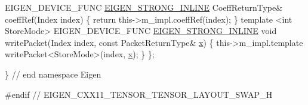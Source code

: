 \begin{DoxyCodeInclude}
  EIGEN\_DEVICE\_FUNC \hyperlink{eigen_2_eigen_2src_2_core_2util_2_macros_8h_af2b60117c00a6e75812de43bfe7db3b1}{EIGEN\_STRONG\_INLINE} CoeffReturnType& coeffRef(Index index)
  \{
    \textcolor{keywordflow}{return} this->m\_impl.coeffRef(index);
  \}
  \textcolor{keyword}{template} <\textcolor{keywordtype}{int} StoreMode> EIGEN\_DEVICE\_FUNC \hyperlink{eigen_2_eigen_2src_2_core_2util_2_macros_8h_af2b60117c00a6e75812de43bfe7db3b1}{EIGEN\_STRONG\_INLINE}
  \textcolor{keywordtype}{void} writePacket(Index index, \textcolor{keyword}{const} PacketReturnType& \hyperlink{eigen_2bench_2btl_2data_2gnuplot__common__settings_8hh_a5fd331c99e778f04762be6d8173eb4d2}{x})
  \{
    this->m\_impl.template writePacket<StoreMode>(index, \hyperlink{eigen_2bench_2btl_2data_2gnuplot__common__settings_8hh_a5fd331c99e778f04762be6d8173eb4d2}{x});
  \}
\};

\} \textcolor{comment}{// end namespace Eigen}

\textcolor{preprocessor}{#endif // EIGEN\_CXX11\_TENSOR\_TENSOR\_LAYOUT\_SWAP\_H}
\end{DoxyCodeInclude}
 